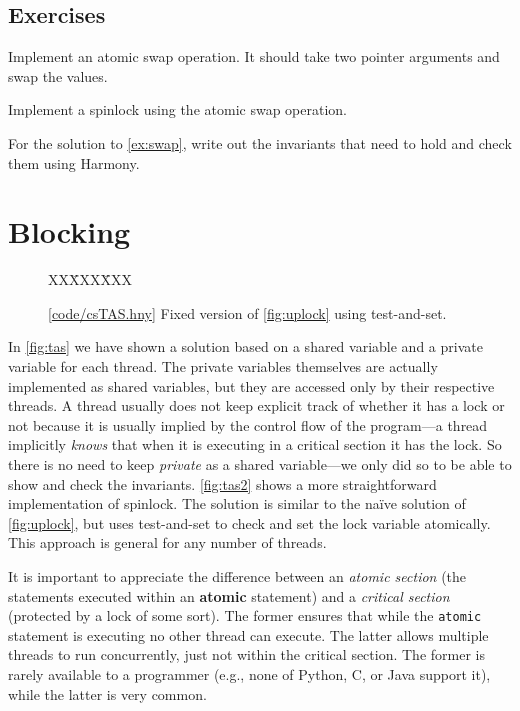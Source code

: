 \documentclass{report}
\newcommand{\harmonysource}[1]{
\begin{tabbing}
XX\=XXX\=XXX\kill
    
\end{tabbing}
}
\newcommand{\harmonylink}[1]{%
[\href{https://harmony.cs.cornell.edu/#1}{\underline{#1}}]%
}
\newenvironment{code}{
\tcolorbox
}{
\endtcolorbox
}
\begin{document}
\section*{Exercises}
\begin{problems}
\item Implement an atomic swap operation.  It should take two pointer arguments
and swap the values.
\item \label{ex:swap} Implement a spinlock using the atomic swap operation.
\item For the solution to \autoref{ex:swap},
write out the invariants that need to hold and check them using Harmony.
\end{problems}

\chapter{Blocking}
\label{ch:synch}
%
%

\begin{figure}
\begin{code}
\harmonysource{csTAS}
\end{code}
\caption{\harmonylink{code/csTAS.hny} Fixed version of \autoref{fig:uplock} using test-and-set.}
\label{fig:tas2}
\end{figure}

In \autoref{fig:tas} we have shown a solution based on a shared
variable and a private variable for each thread.   The private
variables themselves are actually implemented as shared variables,
but they are accessed only by their respective threads.
A thread usually does not keep explicit track of whether it has a lock
or not because it is usually implied by the control flow of the program---a
thread implicitly \emph{knows} that when it is executing in a critical
section it has the lock.
So there is no need to keep \textit{private} as a shared
variable---we only did so to be able to show and check the invariants.
\autoref{fig:tas2} shows a more straightforward implementation of spinlock.
The solution is similar to the na\"{i}ve solution of \autoref{fig:uplock},
but uses test-and-set to check and set the lock variable atomically.
This approach is general for any number of threads.

It is important to appreciate the difference between an
\emph{atomic section} (the statements executed within an
\textbf{atomic} statement) and a \emph{critical section}
(protected by a lock of some sort).
The former ensures that while the
\texttt{atomic} statement is executing no other thread can execute.
The latter allows multiple threads to run concurrently,
just not within the critical section.
The former is rarely available to a programmer (e.g., none of
Python, C, or Java support it), while the latter
is very common.
\end{document}

